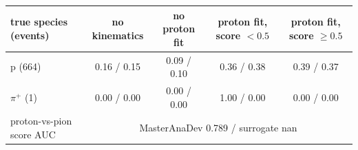 \begin{tabular}{lcccc}
\toprule
true species (events) & no kinematics & no proton fit & proton fit, score $<0.5$ & proton fit, score $\geq 0.5$ \\
\midrule
p (664) & 0.16 / 0.15 & 0.09 / 0.10 & 0.36 / 0.38 & 0.39 / 0.37 \\
$\pi^+$ (1) & 0.00 / 0.00 & 0.00 / 0.00 & 1.00 / 0.00 & 0.00 / 0.00 \\
\midrule
proton-vs-pion score AUC & \multicolumn{4}{c}{MasterAnaDev 0.789 / surrogate nan} \\
\bottomrule
\end{tabular}
